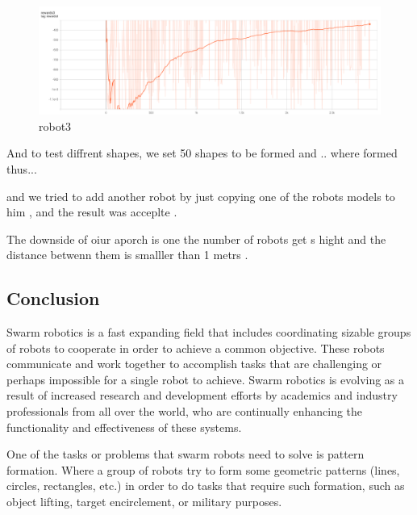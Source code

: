 \documentclass[12pt]{extarticle}
\begin{document}
\begin{figure}[h]  

\includegraphics[scale=0.35]{robot3}
\caption[robot3]{robot3}
\end{figure}


And to test diffrent shapes, we set 50 shapes to be formed and .. where formed thus...


and we tried to add another robot by just copying one of the robots models to him , and the result was acceplte .



The downside of oiur aporch is one the number of robots get s hight and the distance betwenn them is smalller than 1 metrs .

 \newpage
\pagebreak
\hspace{0pt}
\vfill
\begin{center}
\section{Conclusion}
\end{center}
\vfill
\hspace{0pt}

\pagebreak


Swarm robotics is a fast expanding  field that includes coordinating sizable groups of robots to cooperate in order to achieve a common objective. These robots communicate and work together to accomplish tasks that are challenging or perhaps impossible for a single robot to achieve.
Swarm robotics is evolving as a result of increased research and development efforts by academics and industry professionals from all over the world, who are continually enhancing the functionality and effectiveness of these systems.




One of the tasks or problems that swarm robots need to solve is pattern formation. Where a group of robots try to form some geometric patterns (lines, circles, rectangles, etc.) in order to do tasks that require such formation, such as object lifting, target encirclement, or military purposes.
 
\end{document}
